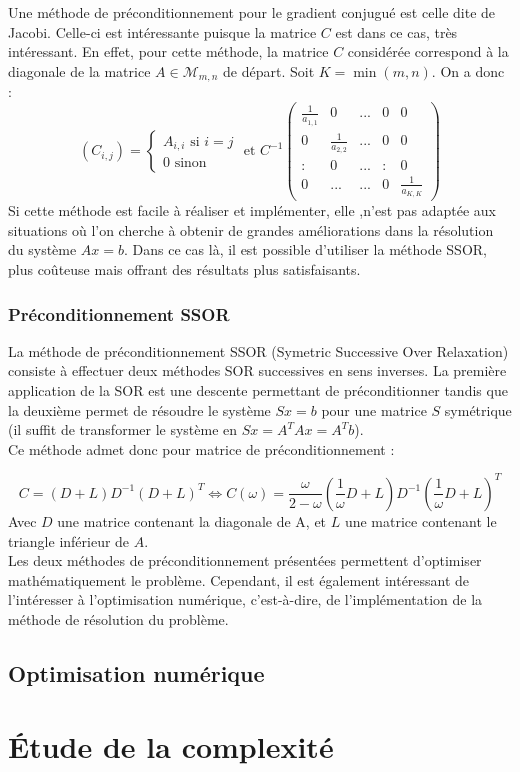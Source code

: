 Une méthode de préconditionnement pour le gradient conjugué est celle dite de Jacobi. Celle-ci est intéressante puisque la matrice $C$ est dans ce cas, très intéressant. En effet, pour cette méthode, la matrice $C$ considérée correspond à la diagonale de la matrice $A\in\mathcal{M}_{m,n}$ de départ. Soit $K=\min(m,n)$. On a donc :
$$
(C_{i,j})=
\begin{cases}
A_{i,i}\text{ si }i=j\\
0\text{ sinon }
\end{cases}
\text{ et }
C^{-1}
\begin{pmatrix}
\frac{1}{a_{1,1}}&0&...&0&0\\
0&\frac{1}{a_{2,2}}&...&0&0\\
:&0&...&:&0\\
0&...&...&0&\frac{1}{a_{K,K}}
\end{pmatrix}
$$
Si cette méthode est facile à réaliser et implémenter, elle ,n'est pas adaptée aux situations où l'on cherche à obtenir de grandes améliorations dans la résolution du système $Ax=b$. Dans ce cas là, il est possible d'utiliser la méthode SSOR, plus coûteuse mais offrant des résultats plus satisfaisants.
\subsubsection{Préconditionnement SSOR}
La méthode de préconditionnement SSOR (Symetric Successive Over Relaxation) consiste à effectuer deux méthodes SOR successives en sens inverses. La première application de la SOR est une descente permettant de préconditionner tandis que la deuxième permet de résoudre le système $Sx=b$ pour une matrice $S$ symétrique (il suffit de transformer le système en $Sx=A^TAx=A^Tb$).\\

Ce méthode admet donc pour matrice de préconditionnement :

$$
C=(D+L)D^{-1}(D+L)^T\Leftrightarrow C(\omega)=\frac{\omega}{2-\omega}(\frac{1}{\omega}D+L)D^{-1}(\frac{1}{\omega}D+L)^T
$$
Avec $D$ une matrice contenant la diagonale de A, et $L$ une matrice contenant le triangle inférieur de $A$.\\

Les deux méthodes de préconditionnement présentées permettent d'optimiser mathématiquement le problème. Cependant, il est également intéressant de l'intéresser à l'optimisation numérique, c'est-à-dire, de l'implémentation de la méthode de résolution du problème.
\subsection{Optimisation numérique}

\section{Étude de la complexité}